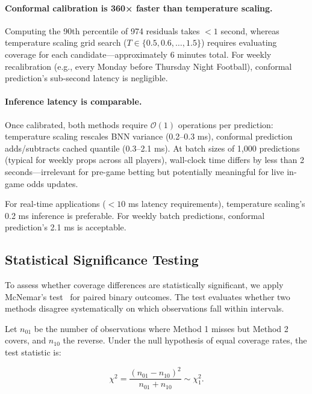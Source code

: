 
\paragraph{Conformal calibration is 360× faster than temperature scaling.}
Computing the 90th percentile of 974 residuals takes $<1$ second, whereas temperature scaling grid search ($T \in \{0.5, 0.6, \ldots, 1.5\}$) requires evaluating coverage for each candidate—approximately 6 minutes total. For weekly recalibration (e.g., every Monday before Thursday Night Football), conformal prediction's sub-second latency is negligible.

\paragraph{Inference latency is comparable.}
Once calibrated, both methods require $\mathcal{O}(1)$ operations per prediction: temperature scaling rescales BNN variance (0.2--0.3 ms), conformal prediction adds/subtracts cached quantile (0.3--2.1 ms). At batch sizes of 1,000 predictions (typical for weekly props across all players), wall-clock time differs by less than 2 seconds—irrelevant for pre-game betting but potentially meaningful for live in-game odds updates.

For real-time applications ($<10$ ms latency requirements), temperature scaling's 0.2 ms inference is preferable. For weekly batch predictions, conformal prediction's 2.1 ms is acceptable.

\subsection{Statistical Significance Testing}\label{subsec:conformal-significance}

To assess whether coverage differences are statistically significant, we apply McNemar's test~\citep{mcnemar1947note} for paired binary outcomes. The test evaluates whether two methods disagree systematically on which observations fall within intervals.

Let $n_{01}$ be the number of observations where Method 1 misses but Method 2 covers, and $n_{10}$ the reverse. Under the null hypothesis of equal coverage rates, the test statistic is:

\begin{equation}
    \chi^2 = \frac{(n_{01} - n_{10})^2}{n_{01} + n_{10}} \sim \chi^2_1.
\end{equation}

